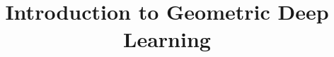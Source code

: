 \documentclass[xcolor=dvipsnames,compress,t,pdf,9pt]{beamer}
\title[\insertframenumber /\inserttotalframenumber]{Introduction to Geometric Deep Learning}
\begin{document}
	\begin{frame}
	\titlepage
	\end{frame}
	
	
\end{document}
